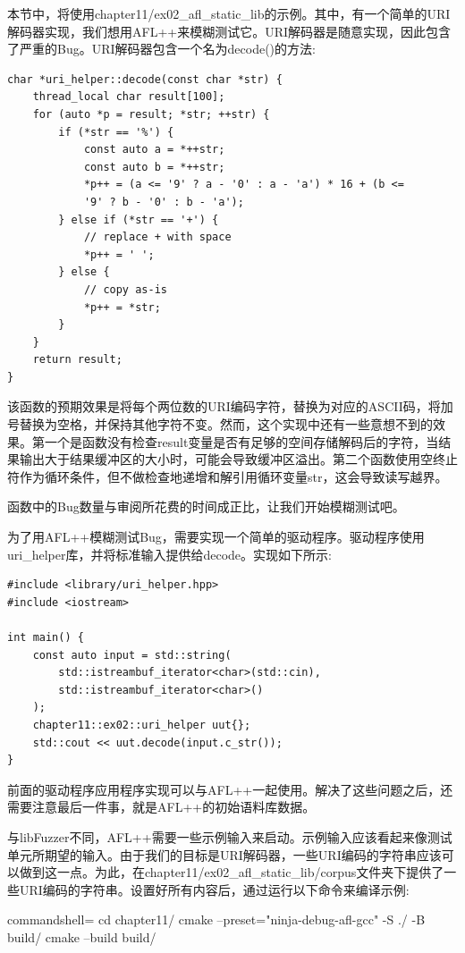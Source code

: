 本节中，将使用chapter11/ex02\_afl\_static\_lib的示例。其中，有一个简单的URI解码器实现，我们想用AFL++来模糊测试它。URI解码器是随意实现，因此包含了严重的Bug。URI解码器包含一个名为decode()的方法:

\begin{lstlisting}[style=styleCXX]
char *uri_helper::decode(const char *str) {
	thread_local char result[100];
	for (auto *p = result; *str; ++str) {
		if (*str == '%') {
			const auto a = *++str;
			const auto b = *++str;
			*p++ = (a <= '9' ? a - '0' : a - 'a') * 16 + (b <=
			'9' ? b - '0' : b - 'a');
		} else if (*str == '+') {
			// replace + with space
			*p++ = ' ';
		} else {
			// copy as-is
			*p++ = *str;
		}
	}
	return result;
}
\end{lstlisting}

该函数的预期效果是将每个两位数的URI编码字符，替换为对应的ASCII码，将加号替换为空格，并保持其他字符不变。然而，这个实现中还有一些意想不到的效果。第一个是函数没有检查result变量是否有足够的空间存储解码后的字符，当结果输出大于结果缓冲区的大小时，可能会导致缓冲区溢出。第二个函数使用空终止符作为循环条件，但不做检查地递增和解引用循环变量str，这会导致读写越界。

函数中的Bug数量与审阅所花费的时间成正比，让我们开始模糊测试吧。

为了用AFL++模糊测试Bug，需要实现一个简单的驱动程序。驱动程序使用uri\_helper库，并将标准输入提供给decode。实现如下所示:

\begin{lstlisting}[style=styleCXX]
#include <library/uri_helper.hpp>
#include <iostream>

int main() {
	const auto input = std::string(
		std::istreambuf_iterator<char>(std::cin),
		std::istreambuf_iterator<char>()
	);
	chapter11::ex02::uri_helper uut{};
	std::cout << uut.decode(input.c_str());
}
\end{lstlisting}

前面的驱动程序应用程序实现可以与AFL++一起使用。解决了这些问题之后，还需要注意最后一件事，就是AFL++的初始语料库数据。

与libFuzzer不同，AFL++需要一些示例输入来启动。示例输入应该看起来像测试单元所期望的输入。由于我们的目标是URI解码器，一些URI编码的字符串应该可以做到这一点。为此，在chapter11/ex02\_afl\_static\_lib/corpus文件夹下提供了一些URI编码的字符串。设置好所有内容后，通过运行以下命令来编译示例:

\begin{tcblisting}{commandshell={}}
cd chapter11/
cmake --preset="ninja-debug-afl-gcc" -S ./ -B build/
cmake --build build/
\end{tcblisting}

